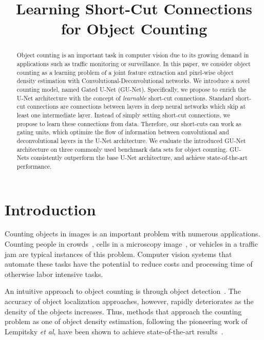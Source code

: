 \documentclass{bmvc2k}
\title{Learning Short-Cut Connections for Object Counting}
\def\etal{\emph{et al}\bmvaOneDot}
\begin{document}
\maketitle

\begin{abstract}
Object counting is an important task in computer vision due to its growing demand in applications such as traffic monitoring or surveillance. In this paper, we consider object counting as a learning problem of a joint feature extraction and pixel-wise object density estimation with Convolutional-Deconvolutional networks. We introduce a novel counting model, named Gated U-Net (GU-Net). Specifically, we propose to enrich the U-Net architecture with the concept of \emph{learnable} short-cut connections. Standard short-cut connections are connections between layers in deep neural networks which skip at least one intermediate layer. Instead of simply setting short-cut connections, we propose to learn these connections from data. Therefore, our short-cuts can work as gating units, which optimize the flow of information between convolutional and deconvolutional layers in the U-Net architecture. We evaluate the introduced GU-Net architecture on three commonly used benchmark data sets for object counting. GU-Nets consistently outperform the base U-Net architecture, and achieve state-of-the-art performance.
\end{abstract}

\section{Introduction}

Counting objects in images is an important problem with numerous applications. Counting people in crowds~\cite{idrees2013}, cells in a microscopy image~\cite{cellsDataset},  or vehicles in a traffic jam \cite{guerrero2015} are typical instances of this problem. Computer vision systems that automate these tasks have the potential to reduce costs and processing time of otherwise labor intensive tasks.

An intuitive approach to object counting is through object detection~\cite{dalal2005,Wu2005,felzenszwalb2010}. The accuracy of object localization approaches, however, rapidly deteriorates as the density of the objects increases. Thus, methods that approach the counting problem as one of object density estimation, following the pioneering work of Lempitsky \etal\cite{lempitsky2010}, have been shown to achieve state-of-the-art results~\cite{arteta2014,zhang_2015_CVPR,Onoro_2016_ECCV,zhang2016}.
\end{document}
